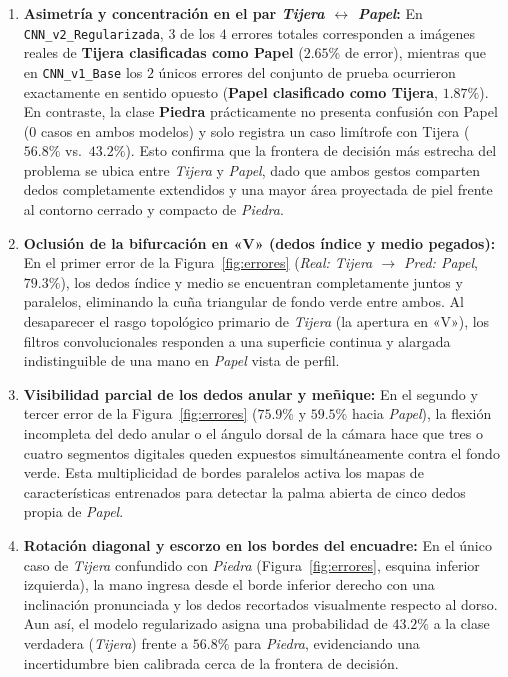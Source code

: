 \begin{enumerate}
    \item \textbf{Asimetría y concentración en el par \textit{Tijera $\leftrightarrow$ Papel}:}
    En \texttt{CNN\_v2\_Regularizada}, $3$ de los $4$ errores totales corresponden a imágenes reales de \textbf{Tijera clasificadas como Papel} ($2.65\%$ de error), mientras que en \texttt{CNN\_v1\_Base} los $2$ únicos errores del conjunto de prueba ocurrieron exactamente en sentido opuesto (\textbf{Papel clasificado como Tijera}, $1.87\%$). En contraste, la clase \textbf{Piedra} prácticamente no presenta confusión con Papel ($0$ casos en ambos modelos) y solo registra un caso limítrofe con Tijera ($56.8\%$ vs.\ $43.2\%$). Esto confirma que la frontera de decisión más estrecha del problema se ubica entre \textit{Tijera} y \textit{Papel}, dado que ambos gestos comparten dedos completamente extendidos y una mayor área proyectada de piel frente al contorno cerrado y compacto de \textit{Piedra}.

    \item \textbf{Oclusión de la bifurcación en «V» (dedos índice y medio pegados):}
    En el primer error de la Figura~\ref{fig:errores} (\textit{Real: Tijera $\to$ Pred: Papel}, $79.3\%$), los dedos índice y medio se encuentran completamente juntos y paralelos, eliminando la cuña triangular de fondo verde entre ambos. Al desaparecer el rasgo topológico primario de \textit{Tijera} (la apertura en «V»), los filtros convolucionales responden a una superficie continua y alargada indistinguible de una mano en \textit{Papel} vista de perfil.

    \item \textbf{Visibilidad parcial de los dedos anular y meñique:}
    En el segundo y tercer error de la Figura~\ref{fig:errores} ($75.9\%$ y $59.5\%$ hacia \textit{Papel}), la flexión incompleta del dedo anular o el ángulo dorsal de la cámara hace que tres o cuatro segmentos digitales queden expuestos simultáneamente contra el fondo verde. Esta multiplicidad de bordes paralelos activa los mapas de características entrenados para detectar la palma abierta de cinco dedos propia de \textit{Papel}.

    \item \textbf{Rotación diagonal y escorzo en los bordes del encuadre:}
    En el único caso de \textit{Tijera} confundido con \textit{Piedra} (Figura~\ref{fig:errores}, esquina inferior izquierda), la mano ingresa desde el borde inferior derecho con una inclinación pronunciada y los dedos recortados visualmente respecto al dorso. Aun así, el modelo regularizado asigna una probabilidad de $43.2\%$ a la clase verdadera (\textit{Tijera}) frente a $56.8\%$ para \textit{Piedra}, evidenciando una incertidumbre bien calibrada cerca de la frontera de decisión.
\end{enumerate}

